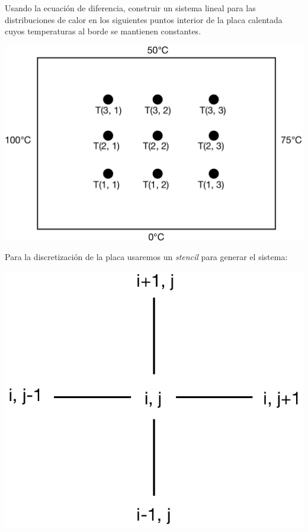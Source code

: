 Usando la ecuación de diferencia, construir un sistema lineal para las distribuciones de calor en los siguientes puntos interior de la placa calentada cuyos temperaturas al borde se mantienen constantes.

\begin{center}
    \includegraphics[scale=0.5]{images/heatingmap.pdf}    
\end{center}

Para la discretización de la placa usaremos un \textit{stencil} para generar el sistema:

\begin{center}
    \includegraphics[scale=0.5]{images/stencil.pdf}
\end{center}

